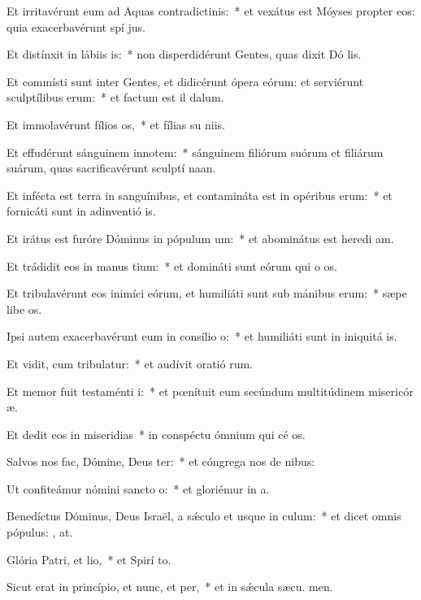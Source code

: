 \item Et irritavérunt eum ad Aquas contradictinis:~* et vexátus est Móyses propter eos: quia exacerbavérunt spí jus.
\item Et distínxit in lábiis is:~* non disperdidérunt Gentes, quas dixit Dó lis.
\item Et commísti sunt inter Gentes, et didicérunt ópera eórum: et serviérunt sculptílibus erum:~* et factum est il  dalum.
\item Et immolavérunt fílios os,~* et fílias su niis.
\item Et effudérunt sánguinem innotem:~* sánguinem filiórum suórum et filiárum suárum, quas sacrificavérunt sculptí naan.
\item Et infécta est terra in sanguínibus, et contamináta est in opéribus erum:~* et fornicáti sunt in adinventió is.
\item Et irátus est furóre Dóminus in pópulum um:~* et abominátus est heredi am.
\item Et trádidit eos in manus tium:~* et domináti sunt eórum qui o os.
\item Et tribulavérunt eos inimíci eórum, et humiliáti sunt sub mánibus erum:~* sæpe libe os.
\item Ipsi autem exacerbavérunt eum in consílio o:~* et humiliáti sunt in iniquitá is.
\item Et vidit, cum tribulatur:~* et audívit oratió rum.
\item Et memor fuit testaménti i:~* et pœnítuit eum secúndum multitúdinem misericór æ.
\item Et dedit eos in miseridias~* in conspéctu ómnium qui cé os.
\item Salvos nos fac, Dómine, Deus ter:~* et cóngrega nos de nibus:
\item Ut confiteámur nómini sancto o:~* et gloriémur in  a.
\item Benedíctus Dóminus, Deus Israël, a sǽculo et usque in culum:~* et dicet omnis pópulus: , at.
\item Glória Patri, et lio,~* et Spirí to.
\item Sicut erat in princípio, et nunc, et per,~* et in sǽcula sæcu. men.
